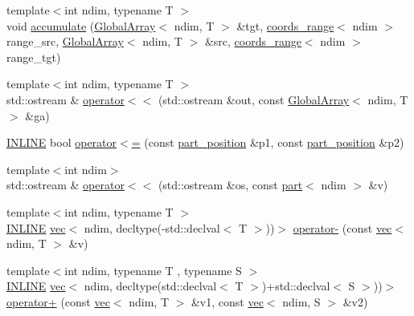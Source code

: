 \begin{DoxyCompactItemize}
\item 
{\footnotesize template$<$int ndim, typename T $>$ }\\void \hyperlink{namespaceshark_1_1ndim_ac2fdde52862b140ea3d88f43d31425fe}{accumulate} (\hyperlink{classshark_1_1ndim_1_1_global_array}{Global\+Array}$<$ ndim, T $>$ \&tgt, \hyperlink{structshark_1_1ndim_1_1coords__range}{coords\+\_\+range}$<$ ndim $>$ range\+\_\+src, \hyperlink{classshark_1_1ndim_1_1_global_array}{Global\+Array}$<$ ndim, T $>$ \&src, \hyperlink{structshark_1_1ndim_1_1coords__range}{coords\+\_\+range}$<$ ndim $>$ range\+\_\+tgt)
\item 
{\footnotesize template$<$int ndim, typename T $>$ }\\std\+::ostream \& \hyperlink{namespaceshark_1_1ndim_a26bc600679af01d20abfd2d8a986e91e}{operator$<$$<$} (std\+::ostream \&out, const \hyperlink{classshark_1_1ndim_1_1_global_array}{Global\+Array}$<$ ndim, T $>$ \&ga)
\item 
\hyperlink{common_8hpp_a2eb6f9e0395b47b8d5e3eeae4fe0c116}{I\+N\+L\+I\+NE} bool \hyperlink{namespaceshark_1_1ndim_a11c1e2d2234f8635e565da16689caba9}{operator$<$=} (const \hyperlink{structshark_1_1ndim_1_1part__position}{part\+\_\+position} \&p1, const \hyperlink{structshark_1_1ndim_1_1part__position}{part\+\_\+position} \&p2)
\item 
{\footnotesize template$<$int ndim$>$ }\\std\+::ostream \& \hyperlink{namespaceshark_1_1ndim_a89ddd7f1cfd6236c1220b92c2e2bdc66}{operator$<$$<$} (std\+::ostream \&os, const \hyperlink{structshark_1_1ndim_1_1part}{part}$<$ ndim $>$ \&v)
\item 
{\footnotesize template$<$int ndim, typename T $>$ }\\\hyperlink{common_8hpp_a2eb6f9e0395b47b8d5e3eeae4fe0c116}{I\+N\+L\+I\+NE} \hyperlink{structshark_1_1ndim_1_1vec}{vec}$<$ ndim, decltype(-\/std\+::declval$<$ T $>$))$>$ \hyperlink{namespaceshark_1_1ndim_abcf5c67c28690043fa9829afb1b617fb}{operator-\/} (const \hyperlink{structshark_1_1ndim_1_1vec}{vec}$<$ ndim, T $>$ \&v)
\item 
{\footnotesize template$<$int ndim, typename T , typename S $>$ }\\\hyperlink{common_8hpp_a2eb6f9e0395b47b8d5e3eeae4fe0c116}{I\+N\+L\+I\+NE} \hyperlink{structshark_1_1ndim_1_1vec}{vec}$<$ ndim, decltype(std\+::declval$<$ T $>$)+std\+::declval$<$ S $>$))$>$ \hyperlink{namespaceshark_1_1ndim_a539041908107c07ec2a9cd6eb9cdc11d}{operator+} (const \hyperlink{structshark_1_1ndim_1_1vec}{vec}$<$ ndim, T $>$ \&v1, const \hyperlink{structshark_1_1ndim_1_1vec}{vec}$<$ ndim, S $>$ \&v2)

\end{DoxyCompactItemize}
